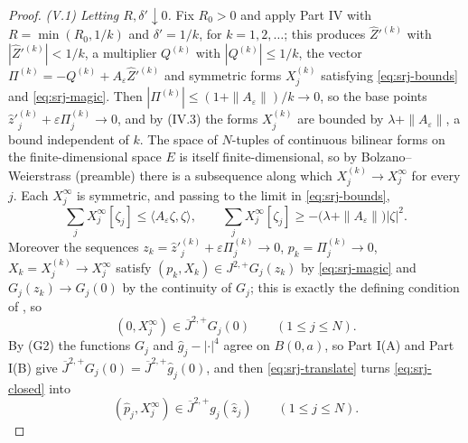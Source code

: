 \begin{proof}
\emph{(V.1) Letting $R,\delta'\downarrow0$.}
Fix $R_0>0$ and apply Part IV with $R=\min(R_0,1/k)$ and $\delta'=1/k$, for
$k=1,2,\dots$; this produces $\widehat Z'^{(k)}$ with
$|\widehat Z'^{(k)}|<1/k$, a multiplier $Q^{(k)}$ with $|Q^{(k)}|\le1/k$, the
vector $\Pi^{(k)}=-Q^{(k)}+A_\varepsilon\widehat Z'^{(k)}$ and symmetric forms
$X_j^{(k)}$ satisfying \eqref{eq:srj-bounds} and \eqref{eq:srj-magic}. Then
$|\Pi^{(k)}|\le(1+\|A_\varepsilon\|)/k\to0$, so the base points
$\widehat z'^{(k)}_j+\varepsilon\Pi_j^{(k)}\to0$, and by (IV.3) the forms
$X_j^{(k)}$ are bounded by $\lambda+\|A_\varepsilon\|$, a bound independent of
$k$. The space of $N$-tuples of continuous bilinear forms on the
finite-dimensional space $E$ is itself finite-dimensional, so by
Bolzano--Weierstrass (preamble) there is a subsequence along which
$X_j^{(k)}\to X_j^{\infty}$ for every $j$. Each $X_j^\infty$ is symmetric, and
passing to the limit in \eqref{eq:srj-bounds},
\begin{equation}\label{eq:srj-limit1}
  \sum_jX_j^\infty[\zeta_j]\le\langle A_\varepsilon\zeta,\zeta\rangle,
  \qquad
  \sum_jX_j^\infty[\zeta_j]\ge-\bigl(\lambda+\|A_\varepsilon\|\bigr)|\zeta|^2 .
\end{equation}
Moreover the sequences
$z_k=\widehat z'^{(k)}_j+\varepsilon\Pi_j^{(k)}\to0$, $p_k=\Pi_j^{(k)}\to0$,
$X_k=X_j^{(k)}\to X_j^\infty$ satisfy $(p_k,X_k)\in J^{2,+}G_j(z_k)$ by
\eqref{eq:srj-magic} and $G_j(z_k)\to G_j(0)$ by the continuity of $G_j$; this
is exactly the defining condition of , so
\begin{equation}\label{eq:srj-closed}
  (0,X_j^\infty)\in\overline J^{2,+}G_j(0)\qquad(1\le j\le N).
\end{equation}
By (G2) the functions $G_j$ and $\widehat g_j-|\cdot|^4$ agree on $B(0,a)$, so
Part I(A) and Part I(B) give
$\overline J^{2,+}G_j(0)=\overline J^{2,+}\widehat g_j(0)$, and then
\eqref{eq:srj-translate} turns \eqref{eq:srj-closed} into
\begin{equation}\label{eq:srj-pj}
  (\widehat p_j,X_j^\infty)\in\overline J^{2,+}g_j(\widehat z_j)
  \qquad(1\le j\le N).
\end{equation}


\end{proof}
